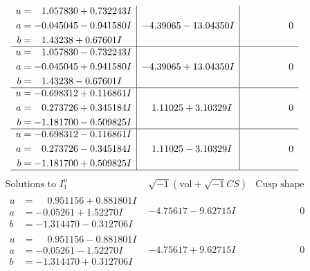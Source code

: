 \documentclass[1p]{elsarticle_modified}
\theoremstyle{definition}
\newcommand{\I}{\sqrt{-1}}
\begin{document}
$$\begin{array}{c|c|c}
\begin{aligned}
u &= \phantom{-}1.057830 + 0.732243 I \\
a &= -0.045045 - 0.941580 I \\
b &= \phantom{-}1.43238 + 0.67601 I\end{aligned}
 & -4.39065 - 13.04350 I & \phantom{-0.000000 } 0 \\ \hline\begin{aligned}
u &= \phantom{-}1.057830 - 0.732243 I \\
a &= -0.045045 + 0.941580 I \\
b &= \phantom{-}1.43238 - 0.67601 I\end{aligned}
 & -4.39065 + 13.04350 I & \phantom{-0.000000 } 0 \\ \hline\begin{aligned}
u &= -0.698312 + 0.116861 I \\
a &= \phantom{-}0.273726 + 0.345184 I \\
b &= -1.181700 - 0.509825 I\end{aligned}
 & \phantom{-}1.11025 + 3.10329 I & \phantom{-0.000000 } 0 \\ \hline\begin{aligned}
u &= -0.698312 - 0.116861 I \\
a &= \phantom{-}0.273726 - 0.345184 I \\
b &= -1.181700 + 0.509825 I\end{aligned}
 & \phantom{-}1.11025 - 3.10329 I & \phantom{-0.000000 } 0\\
 \hline 
 \end{array}$$\newpage$$\begin{array}{c|c|c}  
\text{Solutions to }I^u_{1}& \I (\text{vol} + \sqrt{-1}CS) & \text{Cusp shape}\\
 \hline 
\begin{aligned}
u &= \phantom{-}0.951156 + 0.881801 I \\
a &= -0.05261 + 1.52270 I \\
b &= -1.314470 - 0.312706 I\end{aligned}
 & -4.75617 - 9.62715 I & \phantom{-0.000000 } 0 \\ \hline\begin{aligned}
u &= \phantom{-}0.951156 - 0.881801 I \\
a &= -0.05261 - 1.52270 I \\
b &= -1.314470 + 0.312706 I\end{aligned}
 & -4.75617 + 9.62715 I & \phantom{-0.000000 } 0 \\ \hline\begin{aligned}

\end{aligned}
\end{array}$$
\end{document}
